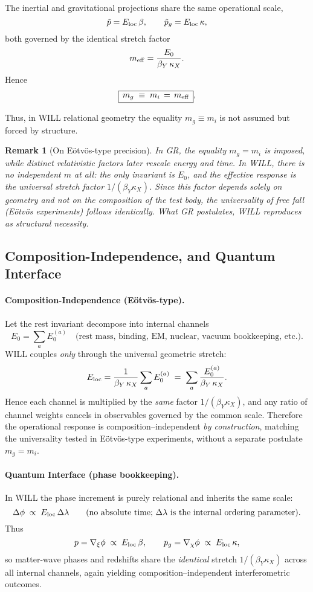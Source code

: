 \documentclass[12pt, a4paper]{article}
\newtheorem{remark}[theorem]{Remark}
\begin{document}
The inertial and gravitational projections share the same operational scale,
\[
\tilde p = E_{\rm loc}\,\beta, \qquad 
\tilde p_g = E_{\rm loc}\,\kappa,
\]
both governed by the identical stretch factor
\[
m_{\rm eff}=\frac{E_0}{\beta_Y\,\kappa_X}.
\]
Hence
\[
\boxed{\, m_g \;\equiv\; m_i \,=\, m_{\rm eff}\,},
\]

Thus, in WILL relational geometry the equality $m_g \equiv m_i$ 
is not assumed but forced by structure. 

\begin{remark}[On Eötvös-type precision]
In GR, the equality $m_g=m_i$ is imposed, while distinct relativistic factors 
later rescale energy and time. In WILL, there is no independent $m$ at all: 
the only invariant is $E_0$, and the effective response is the universal 
stretch factor $1/(\beta_Y\kappa_X)$. Since this factor depends solely on 
geometry and not on the composition of the test body, 
the universality of free fall (Eötvös experiments) follows identically. 
What GR postulates, WILL reproduces as structural necessity.
\end{remark}

\subsection*{Composition-Independence, and Quantum Interface}

\paragraph{Composition-Independence (Eötvös-type).}
Let the rest invariant decompose into internal channels
\[
E_0=\sum_{a} E_0^{(a)}\quad\text{(rest mass, binding, EM, nuclear, vacuum bookkeeping, etc.)}.
\]
WILL couples \emph{only} through the universal geometric stretch:
\[
E_{\rm loc}=\frac{1}{\beta_Y\,\kappa_X}\sum_a E_0^{(a)} \;=\; \sum_a \frac{E_0^{(a)}}{\beta_Y\,\kappa_X}.
\]
Hence each channel is multiplied by the \emph{same} factor $1/(\beta_Y\kappa_X)$, and any ratio of channel weights cancels in observables governed by the common scale. 
Therefore the operational response is composition–independent \emph{by construction}, matching the universality tested in Eötvös-type experiments, without a separate postulate $m_g=m_i$.

\paragraph{Quantum Interface (phase bookkeeping).}
In WILL the phase increment is purely relational and inherits the same scale:
\[
\Delta\phi \;\propto\; E_{\rm loc}\,\Delta\lambda
\qquad(\text{no absolute time; }\Delta\lambda\text{ is the internal ordering parameter}).
\]
Thus
\[
p=\nabla_\xi \phi \;\propto\; E_{\rm loc}\,\beta, 
\qquad 
p_g=\nabla_\chi \phi \;\propto\; E_{\rm loc}\,\kappa,
\]
so matter-wave phases and redshifts share the \emph{identical} stretch $1/(\beta_Y\kappa_X)$ across all internal channels, again yielding composition–independent interferometric outcomes.
\end{document}
